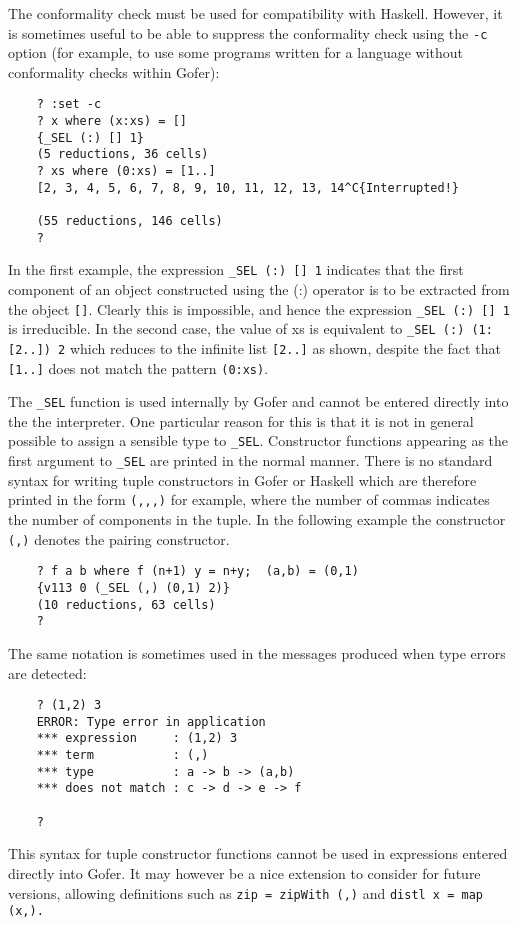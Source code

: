 The conformality check must be used for compatibility with Haskell.
However, it is sometimes useful to be able to suppress the conformality
check using the \verb"-c" option (for example, to use some programs written
for a language without conformality checks within Gofer):
\begin{verbatim}
    ? :set -c
    ? x where (x:xs) = []
    {_SEL (:) [] 1}
    (5 reductions, 36 cells)
    ? xs where (0:xs) = [1..]
    [2, 3, 4, 5, 6, 7, 8, 9, 10, 11, 12, 13, 14^C{Interrupted!}

    (55 reductions, 146 cells)
    ?
\end{verbatim}
In the first example, the expression \verb"_SEL (:) [] 1" indicates that the
first component of an object constructed using the (:) operator is to
be extracted from the object \verb"[]".  Clearly this is impossible, and hence
the expression \verb"_SEL (:) [] 1" is irreducible.  In the second case, the
value of xs is equivalent to \verb"_SEL (:) (1:[2..]) 2" which reduces to
the infinite list \verb"[2..]" as shown, 
despite the fact that \verb"[1..]" does not
match the pattern \verb"(0:xs)".

The \verb"_SEL" function is used internally by Gofer and cannot be
entered directly into the the interpreter.  One particular reason for
this is that it is not in general possible to assign a sensible type
to \verb"_SEL".  
Constructor functions appearing as the first argument to \verb"_SEL"
are printed in the normal manner.  There is no standard syntax for
writing tuple constructors in Gofer or Haskell which are therefore
printed in the form \verb"(,,,)" for example, where the number of commas
indicates the number of components in the tuple.  In the following
example the constructor \verb"(,)" denotes the pairing constructor.
\begin{verbatim}
    ? f a b where f (n+1) y = n+y;  (a,b) = (0,1)
    {v113 0 (_SEL (,) (0,1) 2)}
    (10 reductions, 63 cells)
    ?
\end{verbatim}
The same notation is sometimes used in the messages produced when type
errors are detected:
\begin{verbatim}
    ? (1,2) 3
    ERROR: Type error in application
    *** expression     : (1,2) 3
    *** term           : (,)
    *** type           : a -> b -> (a,b)
    *** does not match : c -> d -> e -> f

    ?
\end{verbatim}
This syntax for tuple constructor functions cannot be used in
expressions entered directly into Gofer.  It may however be a nice
extension to consider for future versions, allowing definitions such
as \verb"zip = zipWith (,)"  and  \verb"distl x = map (x,)."


